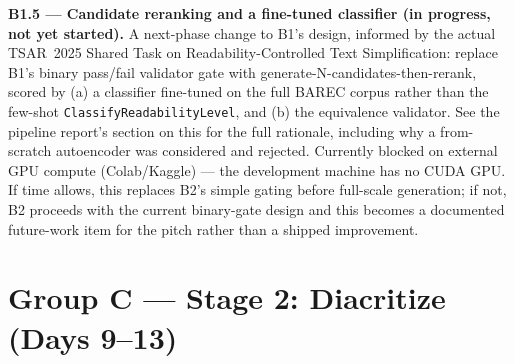 \documentclass[11pt,a4paper]{article}
\begin{document}
\vspace{6pt}
\begin{noteb}
\textbf{B1.5 --- Candidate reranking and a fine-tuned classifier (in
progress, not yet started).} A next-phase change to B1's design, informed
by the actual TSAR~2025 Shared Task on Readability-Controlled Text
Simplification: replace B1's binary pass/fail validator gate with
generate-N-candidates-then-rerank, scored by (a) a classifier fine-tuned
on the full BAREC corpus rather than the few-shot \texttt{ClassifyReadabilityLevel},
and (b) the equivalence validator. See the pipeline report's section on
this for the full rationale, including why a from-scratch autoencoder was
considered and rejected. Currently blocked on external GPU compute
(Colab/Kaggle) --- the development machine has no CUDA GPU. If time
allows, this replaces B2's simple gating before full-scale generation;
if not, B2 proceeds with the current binary-gate design and this becomes
a documented future-work item for the pitch rather than a shipped
improvement.
\end{noteb}

\newpage
\section{Group C --- Stage 2: Diacritize (Days 9--13)}
\end{document}
